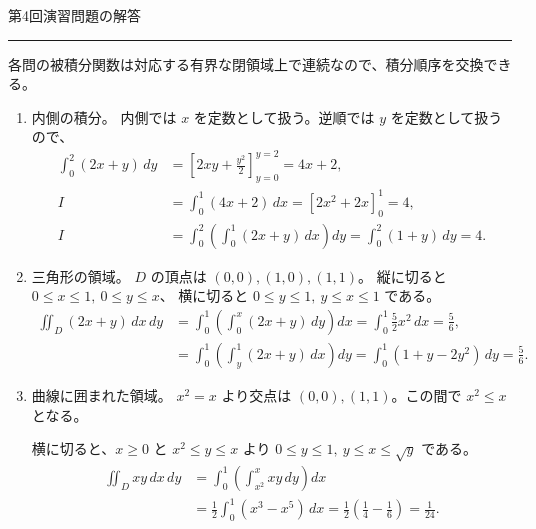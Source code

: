 \documentclass[a4paper,10pt,pdflatex,ja=standard,jafont=ipaex-type1,
  magstyle=real,scale=1]{bxjsarticle}
\newcommand{\handouttitle}[1]{%
  \begin{center}
    {\Large\color{ink}#1}\par\vspace{3mm}
    {\color{accent}\rule{0.88\linewidth}{0.7pt}}
  \end{center}\vspace{-2mm}}
\newenvironment{problems}
  {\begin{enumerate}[leftmargin=2em,itemsep=3pt,topsep=3pt,parsep=0pt,
    font=\color{accent}]}
  {\end{enumerate}}
\newcommand{\examplelabel}[1]{{\sffamily\mdseries\color{ink}#1}}
\begin{document}
\newpage
\handouttitle{第4回\quad 演習問題の解答}
{\small 各問の被積分関数は対応する有界な閉領域上で連続なので、積分順序を交換できる。}\par
\begin{problems}
\setlength{\itemsep}{5pt}
\item \examplelabel{内側の積分。}
内側では $x$ を定数として扱う。逆順では $y$ を定数として扱うので、
$$
 \begin{aligned}
 \int_0^2(2x+y)\,dy
 &=\left[2xy+\frac{y^2}{2}\right]_{y=0}^{y=2}=4x+2,\\
 I&=\int_0^1(4x+2)\,dx=\left[2x^2+2x\right]_0^1=4,\\
 I&=\int_0^2\left(\int_0^1(2x+y)\,dx\right)dy
 =\int_0^2(1+y)\,dy=4.
 \end{aligned}
$$

\item \examplelabel{三角形の領域。}
$D$ の頂点は $(0,0),(1,0),(1,1)$。
縦に切ると $0\le x\le1,\ 0\le y\le x$、
横に切ると $0\le y\le1,\ y\le x\le1$ である。
$$
 \begin{aligned}
 \iint_D(2x+y)\,dx\,dy
 &=\int_0^1\left(\int_0^x(2x+y)\,dy\right)dx
 =\int_0^1\frac52x^2\,dx=\frac56,\\
 &=\int_0^1\left(\int_y^1(2x+y)\,dx\right)dy
 =\int_0^1(1+y-2y^2)\,dy=\frac56.
 \end{aligned}
$$

\item \examplelabel{曲線に囲まれた領域。}
$x^2=x$ より交点は $(0,0),(1,1)$。この間で $x^2\le x$ となる。
\par\noindent\begin{minipage}[c]{0.72\linewidth}
横に切ると、$x\ge0$ と $x^2\le y\le x$ より
$0\le y\le1,\ y\le x\le\sqrt y$ である。
$$
 \begin{aligned}
 \iint_Dxy\,dx\,dy
 &=\int_0^1\left(\int_{x^2}^xxy\,dy\right)dx\\
 &=\frac12\int_0^1(x^3-x^5)\,dx
 =\frac12\left(\frac14-\frac16\right)=\frac1{24}.
 \end{aligned}
$$
\end{minipage}\hfill
\begin{minipage}[c]{0.26\linewidth}
\centering
{}
\end{minipage}\par


\end{problems}
\end{document}
